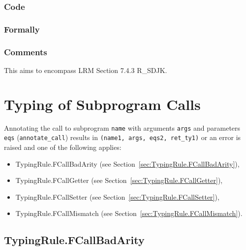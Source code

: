 \documentclass{book}
\begin{document}
  \subsection{Code}

\begin{emptyformal}
    \subsection{Formally}
\end{emptyformal}

\subsection{Comments}
    This aims to encompass LRM Section 7.4.3 R\_SDJK.

\chapter{Typing of Subprogram Calls}

Annotating the call to subprogram \texttt{name} with arguments \texttt{args} and
parameters \texttt{eqs} (\texttt{annotate\_call}) results in \texttt{(name1,
args, eqs2, ret\_ty1)} or an error is raised and one of the following applies:
\begin{itemize}
\item TypingRule.FCallBadArity (see Section~\ref{sec:TypingRule.FCallBadArity}),
\item TypingRule.FCallGetter (see Section~\ref{sec:TypingRule.FCallGetter}),
\item TypingRule.FCallSetter (see Section~\ref{sec:TypingRule.FCallSetter}),
\item TypingRule.FCallMismatch (see Section~\ref{sec:TypingRule.FCallMismatch}).
\end{itemize}

\section{TypingRule.FCallBadArity \label{sec:TypingRule.FCallBadArity}}
\end{document}
